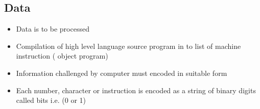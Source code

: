 \documentclass[british]{extreport}
\begin{document}
\subsection{Data}
\begin{itemize}
	\item Data is to be processed
	\item Compilation of high level language source program in to list of machine
	      instruction ( object program)
	\item Information challenged by computer must encoded in suitable form
	\item Each number, character or instruction is encoded as a string of binary
	      digits called bits i.e. (0 or 1)
\end{itemize}
\end{document}
